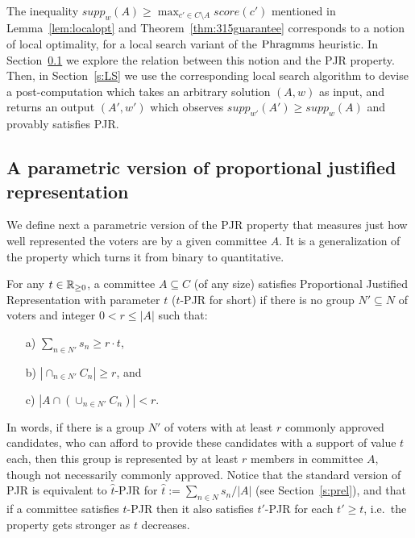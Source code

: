 The inequality $supp_w(A)\geq \max_{c'\in C\setminus A} score(c')$ mentioned in Lemma~\ref{lem:localopt} and Theorem~\ref{thm:315guarantee} corresponds to a notion of local optimality, for a local search variant of the $\operatorname{Phragmms}$ heuristic. 
In Section~\ref{s:tPJR} we explore the relation between this notion and the PJR property. 
Then, in Section~\ref{s:LS} we use the corresponding local search algorithm to devise a post-computation which takes an arbitrary solution $(A,w)$ as input, and returns an output $(A',w')$ which observes $supp_{w'}(A')\geq supp_w(A)$ and provably satisfies PJR.

\subsection{A parametric version of proportional justified representation}\label{s:tPJR}

We define next a parametric version of the PJR property that measures just how well represented the voters are by a given committee $A$. It is a generalization of the property which turns it from binary to quantitative.

\begin{definition}
For any $t\in\mathbb{R}_{\geq 0}$, a committee $A\subseteq C$ (of any size) satisfies Proportional Justified Representation with parameter $t$ ($t$-PJR for short) if there is no group $N'\subseteq N$ of voters and integer $0<r\leq |A|$ such that:
\begin{itemize}
\item[a)] $\sum_{n\in N'} s_n \geq r\cdot t$,
\item[b)] $|\cap_{n\in N'} C_n|\geq r$, and
\item[c)] $|A\cap (\cup_{n\in N'} C_n)|<r$.
\end{itemize}
\end{definition}

In words, if there is a group $N'$ of voters with at least $r$ commonly approved candidates, who can afford to provide these candidates with a support of value $t$ each, then this group is represented by at least $r$ members in committee $A$, though not necessarily commonly approved. Notice that the standard version of PJR is equivalent to $\hat{t}$-PJR for $\hat{t}:=\sum_{n\in N} s_n / |A|$ (see Section~\ref{s:prel}), and that if a committee satisfies $t$-PJR then it also satisfies $t'$-PJR for each $t'\geq t$, i.e.~the property gets stronger as $t$ decreases. 


